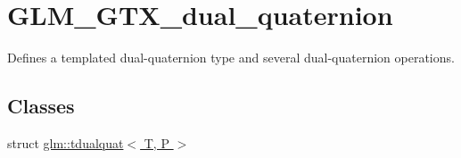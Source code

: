\hypertarget{group__gtx__dual__quaternion}{}\section{G\+L\+M\+\_\+\+G\+T\+X\+\_\+dual\+\_\+quaternion}
\label{group__gtx__dual__quaternion}


Defines a templated dual-\/quaternion type and several dual-\/quaternion operations.  


\subsection*{Classes}
\begin{DoxyCompactItemize}
\item 
struct \hyperlink{structglm_1_1tdualquat}{glm\+::tdualquat$<$ T, P $>$}
\end{DoxyCompactItemize}

